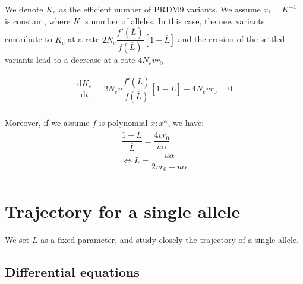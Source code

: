 \documentclass{article}
\begin{document}
We denote $K_e$ as the efficient number of PRDM9 variants.  
We assume $x_i=K^{-1}$ is constant, where $K$ is number of alleles.  
In this case, the new variants contribute to $K_e$ at a rate $2 N_e \dfrac{f'(\overline{L})}{f(\overline{L})} [ 1 - \overline{L} ]$ and the erosion of the settled variants lead to a decrease at a rate $4 N_e v r_0$

\begin{equation}
  \begin{aligned}
    \dfrac{\mathrm{d} K_e }{\mathrm{d}t} =
    2 N_e u \dfrac{f'(\overline{L})}{f(\overline{L})} [ 1 - \overline{L} ] - 4 N_e v r_0 = 0 \\
  \end{aligned}
\end{equation}


Moreover, if we assume $f$ is polynomial $x: x^{\alpha}$, we have:
\begin{equation}
  \begin{aligned}
    \dfrac{1 - \overline{L}}{\overline{L}} =  \dfrac{4 v r_0}{ u \alpha} \\
    \iff \overline{L} =  \dfrac{u \alpha}{2 v r_0 +  u \alpha} \\
  \end{aligned}
\end{equation}

\section{Trajectory for a single allele}

We set $\overline{L}$ as a fixed parameter, and study closely the trajectory of a single allele.


\subsection{Differential equations}
\end{document}
